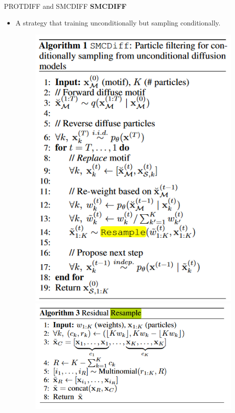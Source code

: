 \documentclass[notheorems, aspectratio=54]{beamer}
\begin{document}
\begin{frame}{PROTDIFF and SMCDIFF}
  \textbf{SMCDIFF}
  \begin{itemize}
    \item A strategy that training unconditionally but sampling conditionally.

    \begin{figure}
      \centering
      \includegraphics[width=0.4\linewidth]{figures/ProtDIFF_algorithm.png}
      \includegraphics[width=0.5\linewidth]{figures/ProtDIFF_algorithm_resample.png}
    \end{figure}
  \end{itemize}
\end{frame}
\end{document}
